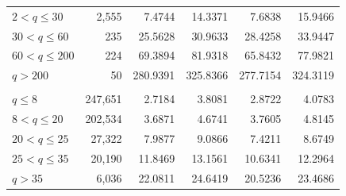 \documentclass[runningheads]{llncs}
\begin{document}
\begin{table}[p]
\begin{tabular}{lrrrrr}
$2<q\le 30$ & 2,555 & 7.4744 & 14.3371 & 7.6838 & 15.9466\\
$30<q\le 60$ & 235 & 25.5628 & 30.9633 & 28.4258 & 33.9447\\
$60<q\le 200$ & 224 & 69.3894 & 81.9318 & 65.8432 & 77.9821\\
$q> 200$ & 50 & 280.9391 & 325.8366 & 277.7154 & 324.3119\\
\addlinespace
\multicolumn{6}{l}{\textit{Instacart vs. S2P2}}\\
$q\le 8$ & 247,651 & 2.7184 & 3.8081 & 2.8722 & 4.0783\\
$8<q\le 20$ & 202,534 & 3.6871 & 4.6741 & 3.7605 & 4.8145\\
$20<q\le 25$ & 27,322 & 7.9877 & 9.0866 & 7.4211 & 8.6749\\
$25<q\le 35$ & 20,190 & 11.8469 & 13.1561 & 10.6341 & 12.2964\\
$q> 35$ & 6,036 & 22.0811 & 24.6419 & 20.5236 & 23.4686\\
\bottomrule
\end{tabular}
\end{table}
\end{document}
